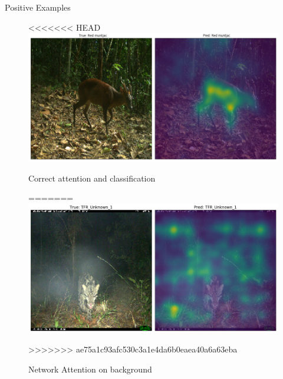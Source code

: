 \documentclass[10pt]{beamer}
\begin{document}

\begin{frame}{Positive Examples}
	\centering
	\begin{figure}
<<<<<<< HEAD
		\includegraphics[width=\columnwidth]{images/Attention_right6.png}
		\caption{Correct attention and classification}
=======
		\includegraphics[width=\columnwidth]{images/result_leo_2.png}
		\caption{Network Attention on background}
>>>>>>> ae75a1c93afc530c3a1e4da6b0eaea40a6a63eba
	\end{figure}
\end{frame}

\end{document}
